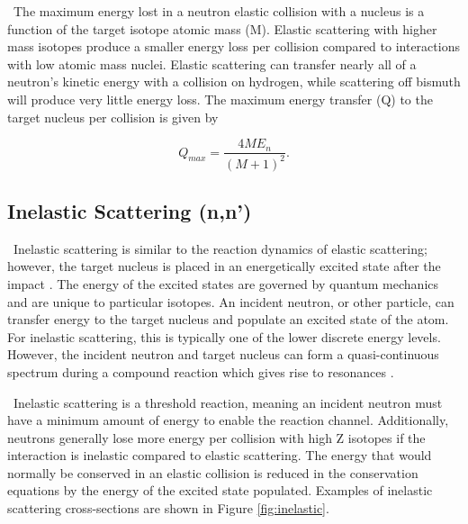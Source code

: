 \ The maximum energy lost in a neutron elastic collision with a nucleus is a function of the target isotope atomic mass (M). 
Elastic scattering with higher mass isotopes produce a smaller energy loss per collision compared to interactions with low atomic mass nuclei. 
Elastic scattering can transfer nearly all of a neutron's kinetic energy with a collision on hydrogen, while scattering off bismuth will produce very little energy loss. 
The maximum energy transfer (Q) to the target nucleus per collision is given by 

\begin{equation} \label{eq:elastic}
    Q_{max}=\dfrac{4ME_{n}}{(M+1)^{2}}.
\end{equation}

\subsection{Inelastic Scattering (n,n')}
\ Inelastic scattering is similar to the reaction dynamics of elastic scattering; however, the target nucleus is placed in an energetically excited state after the impact \cite{Turner}.
The energy of the excited states are governed by quantum mechanics and are unique to particular isotopes. 
An incident neutron, or other particle, can transfer energy to the target nucleus and populate an excited state of the atom.  
For inelastic scattering, this is typically one of the lower discrete energy levels.
However, the incident neutron and target nucleus can form a quasi-continuous spectrum during a compound reaction which gives rise to resonances \cite{Krane}. 

\ Inelastic scattering is a threshold reaction, meaning an incident neutron must have a minimum amount of energy to enable the reaction channel. 
Additionally, neutrons generally lose more energy per collision with high Z isotopes if the interaction is inelastic compared to elastic scattering. %
The energy that would normally be conserved in an elastic collision is reduced in the conservation equations by the energy of the excited state populated. 
Examples of inelastic scattering cross-sections are shown in Figure \ref{fig:inelastic}. %

